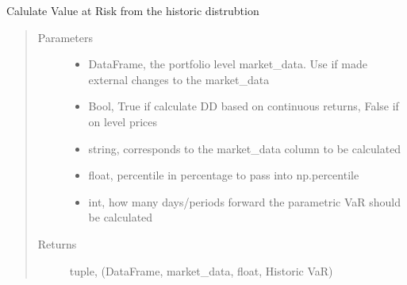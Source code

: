 \documentclass[letterpaper,10pt,english]{sphinxmanual}
\begin{document}
\begin{fulllineitems}
\begin{fulllineitems}
\label{\detokenize{securities:risk_dash.securities.Portfolio.historic_var}}
\sphinxAtStartPar
Calulate Value at Risk from the historic distrubtion
\begin{quote}\begin{description}
\item[{Parameters}] \leavevmode\begin{itemize}
\item {} 
\sphinxAtStartPar
{} \textendash{} DataFrame, the portfolio level market\_data. Use if made external changes to the market\_data

\item {} 
\sphinxAtStartPar
{} \textendash{} Bool, True if calculate DD based on continuous returns, False if on level prices

\item {} 
\sphinxAtStartPar
{} \textendash{} string, corresponds to the market\_data column to be calculated

\item {} 
\sphinxAtStartPar
{} \textendash{} float, percentile in percentage to pass into np.percentile

\item {} 
\sphinxAtStartPar
{} \textendash{} int, how many days/periods forward the parametric VaR should be calculated

\end{itemize}

\item[{Returns}] \leavevmode
\sphinxAtStartPar
tuple, (DataFrame, market\_data, float, Historic VaR)

\end{description}\end{quote}


\end{fulllineitems}
\end{fulllineitems}
\end{document}
